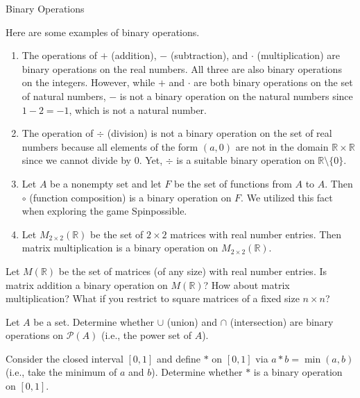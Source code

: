 \begin{section}{Binary Operations}
\begin{example}
Here are some examples of binary operations.
\begin{enumerate}[label=\textrm{(\alph*)}]
\item The operations of $+$ (addition), $-$ (subtraction), and $\cdot$ (multiplication) are binary operations on the real numbers.  All three are also binary operations on the integers.  However, while $+$ and $\cdot$ are both binary operations on the set of natural numbers, $-$ is not a binary operation on the natural numbers since $1-2=-1$, which is not a natural number.
\item The operation of $\div$ (division) is not a binary operation on the set of real numbers because all elements of the form $(a,0)$ are not in the domain $\mathbb{R}\times \mathbb{R}$ since we cannot divide by 0.  Yet, $\div$ is a suitable binary operation on $\mathbb{R}\setminus \{0\}$.
\item Let $A$ be a nonempty set and let $F$ be the set of functions from $A$ to $A$.  Then $\circ$ (function composition) is a binary operation on $F$. We utilized this fact when exploring the game Spinpossible.
\item Let $M_{2\times 2}(\mathbb{R})$ be the set of $2\times 2$ matrices with real number entries.  Then matrix multiplication is a binary operation on $M_{2\times 2}(\mathbb{R})$.
\end{enumerate}
\end{example}

\begin{problem}
Let $M(\mathbb{R})$ be the set of matrices (of any size) with real number entries.  Is matrix addition a binary operation on $M(\mathbb{R})$?  How about matrix multiplication? What if you restrict to square matrices of a fixed size $n\times n$?
\end{problem}

\begin{problem}
Let $A$ be a set. Determine whether $\cup$ (union) and $\cap$ (intersection) are binary operations on $\mathcal{P}(A)$ (i.e., the power set of $A$).
\end{problem}

\begin{problem}
Consider the closed interval $[0,1]$ and define $*$ on $[0,1]$ via $a*b=\min(a,b)$ (i.e., take the minimum of $a$ and $b$).  Determine whether $*$ is a binary operation on $[0,1]$.
\end{problem}


\end{section}

